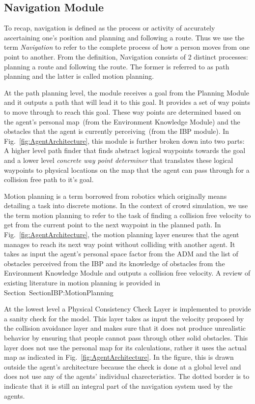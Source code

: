 \subsection{Navigation Module}
\label{IBEVAC:NavigationModule}

To recap, navigation is defined as the process or activity of accurately ascertaining one's position and planning and following a route. Thus we use the term \emph{Navigation} to refer to the complete process of how a person moves from one point to another. From the definition, Navigation consists of 2 distinct processes: planning a route and following the route. The former is referred to as path planning and the latter is called motion planning.

At the path planning level, the module receives a goal from the Planning Module and it outputs a path that will lead it to this goal. It provides a set of way points to move through to reach this goal. These way points are determined based on the agent's personal map~(from the Environment Knowledge Module) and the obstacles that the agent is currently perceiving~(from the IBP module). In Fig.~\ref{fig:AgentArchitecture}, this module is further broken down into two parts: A higher level path finder that finds abstract logical waypoints towards the goal and a lower level \emph{concrete way point determiner} that translates these logical waypoints to physical locations on the map that the agent can pass through for a collision free path to it's goal.

Motion planning is a term borrowed from robotics which originally means detailing a task into discrete motions. In the context of crowd simulation, we use the term motion planning to refer to the task of finding a collision free velocity to get from the current point to the next waypoint in the planned path. In Fig.~\ref{fig:AgentArchitecture}, the motion planning layer ensures that the agent manages to reach its next way point without colliding with another agent. It takes as input the agent's personal space factor from the ADM and the list of obstacles perceived from the IBP and its knowledge of obstacles from the Environment Knowledge Module and outputs a collision free velocity. A review of existing literature in motion planning is provided in Section~{SectionIBP:MotionPlanning}

At the lowest level a Physical Consistency Check Layer is implemented to provide a sanity check for the model. This layer takes as input the velocity proposed by the collision avoidance layer and makes sure that it does not produce unrealistic behavior by ensuring that people cannot pass through other solid obstacles. This layer does not use the personal map for its calculations, rather it uses the actual map as indicated in Fig.~\ref{fig:AgentArchitecture}. In the figure, this is drawn outside the agent's architecture because the check is done at a global level and does not use any of the agents' individual charecteristics. The dotted border is to indicate that it is still an integral part of the navigation system used by the agents.


